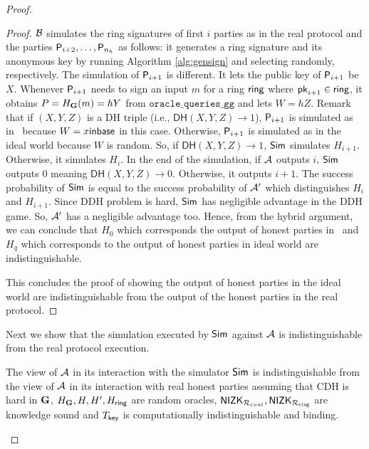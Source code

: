 \begin{proof}
\begin{proof}
			$\mathcal{B} $ simulates the ring signatures of first $ i $ parties as in the real protocol and the parties $ \mathsf{P}_{i+2}, \ldots, \mathsf{P}_{n_h} $ as follows: it generates a ring signature and its anonymous key by running Algorithm \ref{alg:gensign} and selecting randomly, respectively. The simulation of $ \mathsf{P}_{i + 1} $ is different. It lets the public key of $ \mathsf{P}_{i + 1} $ be $ X$. Whenever $ \mathsf{P}_{i+1} $ needs to sign an input $ m$ for a ring $ \mathsf{ring} $ where $ \mathsf{pk}_{i+1} \in \mathsf{ring}$, it obtains $ P = H_{\mathbf{G}}(m) = hY $ from $ \mathtt{oracle\_queries\_gg} $ and lets $ W = hZ $. Remark that if $ (X,Y,Z)$ is a DH triple (i.e., $  \mathsf{DH}(X,Y,Z) \rightarrow 1 $), $ \mathsf{P}_{i+1} $ is simulated as in \name \ because $ W = x{\mathsf{inbase}}$ in this case. Otherwise, $ \mathsf{P}_{i+1} $ is simulated as in the ideal world because $ W $ is random. So, if $  \mathsf{DH}(X,Y,Z)  \rightarrow 1$, $\mathsf{Sim} $ simulates $ H_{i+1} $. Otherwise, it simulates $ H_{i} $. In the end of the simulation, if $ \mathcal{A} $ outputs $ i $, $\mathsf{Sim} $ outputs $ 0 $ meaning $  \mathsf{DH}(X,Y,Z) \rightarrow 0$. Otherwise, it outputs $ i + 1 $. The success probability of $\mathsf{Sim} $ is equal to the success probability of $ \mathcal{A}' $ which distinguishes $ H_i $ and $ H_{i +1} $. Since DDH problem is hard, $\mathsf{Sim} $ has negligible advantage in the DDH game. So, $ \mathcal{A}' $ has a negligible advantage too. Hence, from the hybrid argument, we can conclude that $ H_0    $ which corresponds the output of honest parties in  \name\ and $ H_q  $ which corresponds to  the output of honest parties in ideal world are indistinguishable.
			
			This concludes the proof of showing the output of honest parties in the ideal world are indistinguishable from the output of the honest parties in the real protocol.
		\end{proof}	
		
		Next we show that the simulation executed by $ \mathsf{Sim} $ against $ \mathcal{A} $ is indistinguishable from the real protocol execution.
		
		\begin{lemma} \label{lem:simulation-ind}
			The view of $ \mathcal{A} $ in its interaction with the simulator $ \mathsf{Sim} $ is indistinguishable from the view of $ \mathcal{A} $ in its interaction with real honest parties assuming that CDH is hard in $ {\mathbf{G}} $, $H_{\mathbf{G}}, H, H', H_\mathsf{ring} $ are random oracles, $ {\mathsf{NIZK}}_{\mathcal{R}_{eval}}, {\mathsf{NIZK}}_{\mathcal{R}_{\mathtt{ring}}} $ are knowledge sound and $ T_{\mathsf{key}} $ is computationally indistinguishable and binding.
		\end{lemma}
		

\end{proof}
